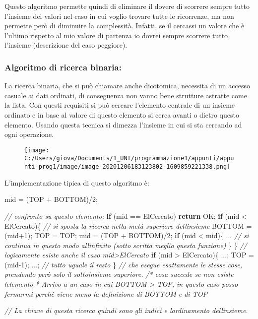 \documentclass[
]{article}
\newenvironment{Shaded}{}{}
\newcommand{\CommentTok}[1]{\textcolor[rgb]{0.38,0.63,0.69}{\textit{#1}}}
\newcommand{\ControlFlowTok}[1]{\textcolor[rgb]{0.00,0.44,0.13}{\textbf{#1}}}
\newcommand{\DecValTok}[1]{\textcolor[rgb]{0.25,0.63,0.44}{#1}}
\newcommand{\NormalTok}[1]{#1}
\begin{document}
Questo algoritmo permette quindi di eliminare il dovere di scorrere
sempre tutto l'insieme dei valori nel caso in cui voglio trovare tutte
le ricorrenze, ma non permette però di diminuire la complessità.
Infatti, se il cercassi un valore che è l'ultimo rispetto al mio valore
di partenza io dovrei sempre scorrere tutto l'insieme (descrizione del
caso peggiore).

\hypertarget{header-n1550}{%
\subsubsection{Algoritmo di ricerca binaria:}\label{header-n1550}}

La ricerca binaria, che si può chiamare anche dicotomica, necessita di
un accesso casuale ai dati ordinati, di conseguenza non vanno bene
strutture astratte come la lista. Con questi requisiti si può cercare
l'elemento centrale di un insieme ordinato e in base al valore di questo
elemento si cerca avanti o dietro questo elemento. Usando questa tecnica
si dimezza l'insieme in cui si sta cercando ad ogni operazione.

\begin{figure}
\centering
\texttt{[image: C:/Users/giova/Documents/1\_UNI/programmazione1/appunti/appunti-prog1/image/image-20201206183123802-1609859221338.png]}
\caption{}
\end{figure}

L'implementazione tipica di questo algoritmo è:

\begin{Shaded}
\begin{Highlighting}[]
\NormalTok{mid = (TOP + BOTTOM)/}\DecValTok{2}\NormalTok{;}

\CommentTok{// confronto su questo elemento:}
\ControlFlowTok{if}\NormalTok{ (mid == ElCercato) }\ControlFlowTok{return}\NormalTok{ OK;}
\ControlFlowTok{if}\NormalTok{ (mid \textless{} ElCercato)\{}
    \CommentTok{// si sposta la ricerca nella metà superiore dell\textquotesingle{}insieme}
\NormalTok{    BOTTOM = (mid+}\DecValTok{1}\NormalTok{);}
\NormalTok{    TOP = TOP;}
\NormalTok{    mid = (TOP + BOTTOM)/}\DecValTok{2}\NormalTok{;}
    \ControlFlowTok{if}\NormalTok{ (mid \textless{} mid)\{}
\NormalTok{        ... }\CommentTok{// si continua in questo modo all\textquotesingle{}infinito (sotto scritta meglio questa funzione)}
\NormalTok{    \}}
\NormalTok{\}}
\CommentTok{// logicamente esiste anche il caso mid\textgreater{}ElCercato }
\ControlFlowTok{if}\NormalTok{ (mid \textgreater{} ElCercato)\{}
\NormalTok{    ...;}
\NormalTok{    TOP = (mid{-}}\DecValTok{1}\NormalTok{);}
\NormalTok{    ...; }\CommentTok{// tutto uguale il resto}
\NormalTok{\} }\CommentTok{// che esegue esattamente le stesse cose, prendendo però solo il sottoinsieme superiore.}
\CommentTok{/* cosa succede se non esiste l\textquotesingle{}elemento}
\CommentTok{ * Arrivo a un caso in cui BOTTOM \textgreater{} TOP, in questo caso posso fermarmi perchè viene meno la definizione di BOTTOM e di TOP}

\CommentTok{// La chiave di questa ricerca quindi sono gli indici e l\textquotesingle{}ordinamento dell\textquotesingle{}insieme.}
\end{Highlighting}
\end{Shaded}
\end{document}

